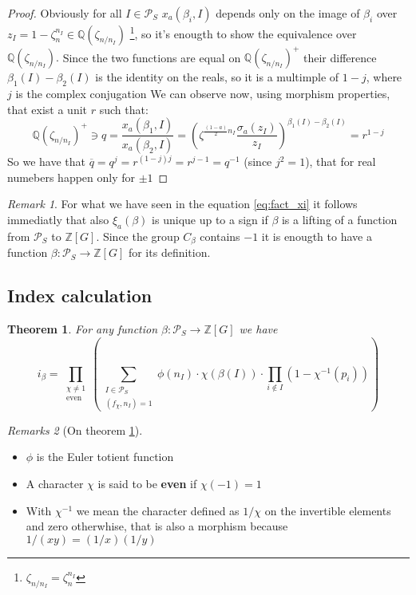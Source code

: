 \documentclass[]{article}
\theoremstyle{plain}
\newtheorem{teo}{Theorem}[section]
\theoremstyle{remark}
\newtheorem{rem}{Remark}
\newtheorem{rems}[rem]{Remarks}
\theoremstyle{definition}
\newcommand{\PS}{\mathcal{P}_S}
\newcommand{\Z}{\mathbb{Z}}
\newcommand{\Q}{\mathbb{Q}}
\begin{document}
	\begin{proof}
		Obviously for all $ I \in \PS $ $ 	x_a(\beta_i , I) $ depends only on the image of $ \beta_i $ over $ z_I = 1- \zeta_n ^{n_I} \in \Q(\zeta_{n/n_I}) $ \footnote{ $ \zeta_{n/n_I} =  \zeta_n^{n_I} $}, so it's enougth to show the equivalence over $  \Q(\zeta_{n/n_I}). $ Since the two functions are equal on $ \Q(\zeta_{n/n_I})^+ $ their difference $ \beta_1(I) - \beta_2 (I)  $ is the identity on the reals, so it is a multimple of $ 1 - j $, where $ j $ is the complex conjugation %
		We can observe now, using morphism properties, that exist a unit $ r $ such that:
		\begin{equation*}
			\Q (\zeta_{n/n_I})^+ \ni q = \frac{x_a(\beta_1 , I)}{x_a(\beta_2 , I)} = {\left( \zeta ^{\frac{(1-a)}{2} n_I } \frac{\sigma_a (	z_I )}{z_I } \right)  }^{\beta_1(I) - \beta_2 (I)} = r ^{1-j}
		\end{equation*}	
		So we have that $ \overline{q}=q^j = r^{(1-j)j} = r^{j  - 1 }= q^{-1}$ (since $j^2 = 1 $), that for real numebers happen only for $ \pm 1 $
	\end{proof}

	\begin{rem}
		For what we have seen in the equation \ref{eq:fact_xi} it follows immediatly that also $ \xi_a(\beta) $ is unique up to a sign if $\beta$ is a lifting of a function from $ \PS $ to $ \Z[G] $. Since the group $ C_\beta $ contains $ -1 $ it is enougth to have a function $ \beta : \PS \to \Z[G]$ for its definition.
	\end{rem}

	\subsection{Index calculation}
	
	\begin{teo}
		\label{teo:idx1}
		For any function $ \beta : \PS \to \Z [G] $ we have
		\begin{equation}
		\label{eq:idx1}
			i_\beta = \prod_{ \substack{\chi \neq 1 \\ \text{even}}} \left( \sum_{\substack{ I \in \PS \\ (f_\chi , n_I) = 1}} \phi (n_I) \cdot \chi (\beta (I)) \cdot \prod_{i \not \in  I} (1- \chi^{-1} (p_i)) \right) 
		\end{equation}
	\end{teo}

	\begin{rems}[On theorem \ref{teo:idx1}]
		\begin{itemize}
			\item $\phi$ is the Euler totient function
			\item A character $\chi$ is said to be \textbf{even} if $ \chi (-1) = 1 $
			\item With $ \chi^{-1} $ we mean the character defined as $ 1/\chi $ on the invertible elements and zero otherwhise, that is also a morphism because $ 1/(xy) = (1/x)(1/y)$ %
			
			
		\end{itemize}
	\end{rems}
\end{document}
